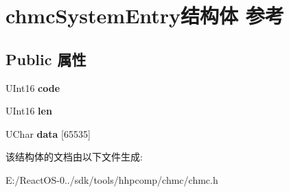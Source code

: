 \hypertarget{structchmc_system_entry}{}\section{chmc\+System\+Entry结构体 参考}
\label{structchmc_system_entry}
\subsection*{Public 属性}
\begin{DoxyCompactItemize}
\item 
\mbox{\label{structchmc_system_entry_afe8f4a6c06661aaa6c0d9a97a32af330}} 
U\+Int16 {\bfseries code}
\item 
\mbox{\label{structchmc_system_entry_a374af0cb4af3cf16d943d9f325e03a19}} 
U\+Int16 {\bfseries len}
\item 
\mbox{\label{structchmc_system_entry_a5b8452424990f5e3a8f5434883e0b528}} 
U\+Char {\bfseries data} \mbox{[}65535\mbox{]}
\end{DoxyCompactItemize}


该结构体的文档由以下文件生成\+:\begin{DoxyCompactItemize}
\item 
E\+:/\+React\+O\+S-\/0../sdk/tools/hhpcomp/chmc/chmc.\+h\end{DoxyCompactItemize}
